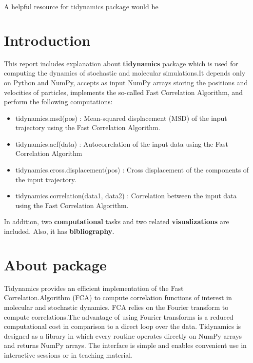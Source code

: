 \documentclass[12pt, a4paper, twoside]{report}
\begin{document}
%
%
A helpful resource for tidynamics package would be \cite{ tidynamics_2018}

%






\newpage
\section{Introduction}

This report includes explanation about \textbf{tidynamics} package which is used for computing the dynamics of stochastic and molecular simulations.It depends only on Python and NumPy, accepts as input NumPy arrays storing the positions and velocities of particles, implements the so-called Fast Correlation Algorithm, and perform the following computations:
\begin{itemize}
  \item tidynamics.msd(pos) : Mean-squared displacement (MSD) of the input trajectory using the Fast Correlation Algorithm.
  \item tidynamics.acf(data) : Autocorrelation of the input data using the Fast Correlation Algorithm
  \item tidynamics.cross.displacement(pos) : Cross displacement of the components of the input trajectory.
  \item tidynamics.correlation(data1, data2) : Correlation between the input data using the Fast Correlation Algorithm.

\end{itemize}
In addition, two \textbf{computational} tasks and two related \textbf{visualizations} are included. Also, it has \textbf{bibliography}.

\newpage
\section{About package}
Tidynamics provides an efficient implementation of the Fast Correlation.\newline Algorithm (FCA)
to compute correlation functions of interest in molecular and stochastic dynamics. FCA relies on the Fourier transform to compute correlations.The advantage of using Fourier transforms is a reduced computational cost in comparison to a direct loop over the data. Tidynamics is designed as a library in which every routine operates directly on NumPy arrays and returns NumPy arrays. The interface is simple and enables convenient use in interactive sessions or in teaching material.
\end{document}
